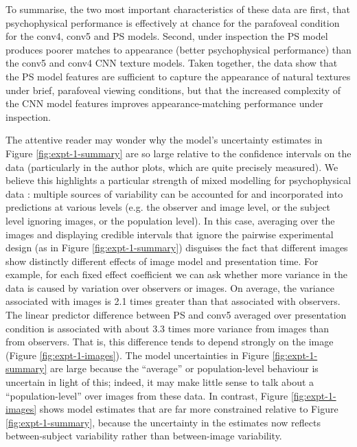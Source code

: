 \documentclass[doc, 11pt,a4paper,natbib]{apa6}\usepackage[]{graphicx}\usepackage[]{color}
\begin{document}
To summarise, the two most important characteristics of these data are first, that psychophysical performance is effectively at chance for the parafoveal condition for the conv4, conv5 and PS models.
Second, under inspection the PS model produces poorer matches to appearance (better psychophysical performance) than the conv5 and conv4 CNN texture models.
Taken together, the data show that the PS model features are sufficient to capture the appearance of natural textures under brief, parafoveal viewing conditions, but that the increased complexity of the CNN model features improves appearance-matching performance under inspection.



The attentive reader may wonder why the model's uncertainty estimates in Figure \ref{fig:expt-1-summary} are so large relative to the confidence intervals on the data (particularly in the author plots, which are quite precisely measured).
We believe this highlights a particular strength of mixed modelling for psychophysical data \citep{cheung_nonlinear_2008,knoblauch_modeling_2012,moscatelli_modeling_2012}: multiple sources of variability can be accounted for and incorporated into predictions at various levels (e.g. the observer and image level, or the subject level ignoring images, or the population level).
In this case, averaging over the images and displaying credible intervals that ignore the pairwise experimental design (as in Figure \ref{fig:expt-1-summary}) disguises the fact that different images show distinctly different effects of image model and presentation time.
For example, for each fixed effect coefficient we can ask whether more variance in the data is caused by variation over observers or images.
On average, the variance associated with images is 2.1 times greater than that associated with observers.
The linear predictor difference between PS and conv5 averaged over presentation condition is associated with about 3.3 times more variance from images than from observers.
That is, this difference tends to depend strongly on the image (Figure \ref{fig:expt-1-images}).
The model uncertainties in Figure \ref{fig:expt-1-summary} are large because the ``average'' or population-level behaviour is uncertain in light of this; indeed, it may make little sense to talk about a ``population-level'' over images from these data.
In contrast, Figure \ref{fig:expt-1-images} shows model estimates that are far more constrained relative to Figure \ref{fig:expt-1-summary}, because the uncertainty in the estimates now reflects between-subject variability rather than between-image variability.
\end{document}
